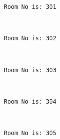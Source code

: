 \documentclass[11pt]{article}
\begin{document}
    \begin{Verbatim}[commandchars=\\\{\}]
Room No is: 301

    \end{Verbatim}

    \begin{center}
    \end{center}
    { \hspace*{\fill} \\}
    
    \begin{Verbatim}[commandchars=\\\{\}]
Room No is: 302

    \end{Verbatim}

    \begin{center}
    \end{center}
    { \hspace*{\fill} \\}
    
    \begin{Verbatim}[commandchars=\\\{\}]
Room No is: 303

    \end{Verbatim}

    \begin{center}
    \end{center}
    { \hspace*{\fill} \\}
    
    \begin{Verbatim}[commandchars=\\\{\}]
Room No is: 304

    \end{Verbatim}

    \begin{center}
    \end{center}
    { \hspace*{\fill} \\}
    
    \begin{Verbatim}[commandchars=\\\{\}]
Room No is: 305

    \end{Verbatim}
\end{document}
